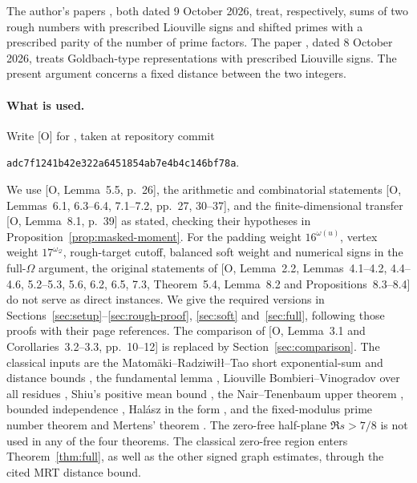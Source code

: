 \documentclass[11pt]{article}
\theoremstyle{definition}
\theoremstyle{remark}
\numberwithin{equation}{section}
\newcommand{\Qset}{\mathcal Q}
\begin{document}
The author's papers \cite{GuoRough,GuoShifted}, both dated 9 October 2026, treat, respectively, sums of two rough
numbers with prescribed Liouville signs and shifted primes with a prescribed parity of the number of prime
factors. The paper \cite{GuoEarlier}, dated 8 October 2026, treats Goldbach-type representations with prescribed
Liouville signs. The present argument concerns a fixed distance between the two integers.

\paragraph{What is used.}
Write [O] for \cite{OpenAI007}, taken at repository commit
\begin{center}\small\nolinkurl{adc7f1241b42e322a6451854ab7e4b4c146bf78a}.\end{center}
We use [O, Lemma~5.5, p.~26], the arithmetic and combinatorial statements
[O, Lemmas~6.1, 6.3--6.4, 7.1--7.2, pp.~27, 30--37], and the finite-dimensional transfer
[O, Lemma~8.1, p.~39] as stated, checking their hypotheses in Proposition~\ref{prop:masked-moment}.
For the padding weight $16^{\omega(u)}$, vertex weight $17^{\omega_{\Qset}}$, rough-target cutoff, balanced soft
weight and numerical signs in the full-$\Omega$ argument, the original statements of [O, Lemma~2.2,
Lemmas~4.1--4.2, 4.4--4.6, 5.2--5.3, 5.6, 6.2, 6.5, 7.3, Theorem~5.4, Lemma~8.2 and Propositions~8.3--8.4] do not
serve as direct instances. We give the required versions in Sections~\ref{sec:setup}--\ref{sec:rough-proof},
\ref{sec:soft} and~\ref{sec:full}, following those proofs with their page references.
The comparison of [O, Lemma~3.1 and Corollaries~3.2--3.3, pp.~10--12] is replaced by
Section~\ref{sec:comparison}. The classical inputs are the Matom\"aki--Radziwi\l\l--Tao short exponential-sum
and distance bounds \cite[Theorem~1.7 and (1.12), p.~6]{MRT}, the fundamental lemma
\cite[Theorem~3.6(a), p.~38]{Ford}, Liouville Bombieri--Vinogradov over all residues
\cite[(1.5), p.~2]{PintzBV}, Shiu's positive mean bound \cite[p.~1]{Henriot}, the Nair--Tenenbaum upper theorem
\cite[Theorem~1, pp.~1--2]{Henriot}, bounded independence \cite{Bazzi,Razborov,Braverman}, Hal\'asz in the form
\cite[Chapter~III.4]{Tenenbaum}, and the fixed-modulus prime number theorem and Mertens' theorem \cite{MV}.
The zero-free half-plane $\Re s>7/8$ is not used in any of the four theorems. The classical zero-free region enters
Theorem~\ref{thm:full}, as well as the other signed graph estimates, through the cited MRT distance bound.
\end{document}
